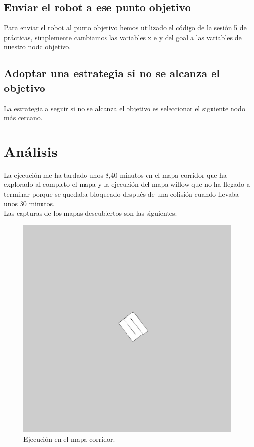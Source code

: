 \documentclass[11pt]{article}
\begin{document}
\subsection{Enviar el robot a ese punto objetivo}
Para enviar el robot al punto objetivo hemos utilizado el código de la sesión 5 de prácticas, simplemente cambiamos las variables x e y del goal a las variables de nuestro nodo objetivo.

\subsection{Adoptar una estrategia si no se alcanza el objetivo}
La estrategia a seguir si no se alcanza el objetivo es seleccionar el siguiente nodo más cercano.

\section{Análisis}
La ejecución me ha tardado unos 8,40 minutos en el mapa corridor que ha explorado al completo el mapa y la ejecución del mapa willow que no ha llegado a terminar porque se quedaba bloqueado después de una colisión cuando llevaba unos 30 minutos.\\

Las capturas de los mapas descubiertos son las siguientes:

\begin{figure}[H] 
	\centering
	\includegraphics[width=15cm]{img/ejecucion1.png}
	\caption{Ejecución en el mapa corridor.}
\end{figure}
\end{document}
